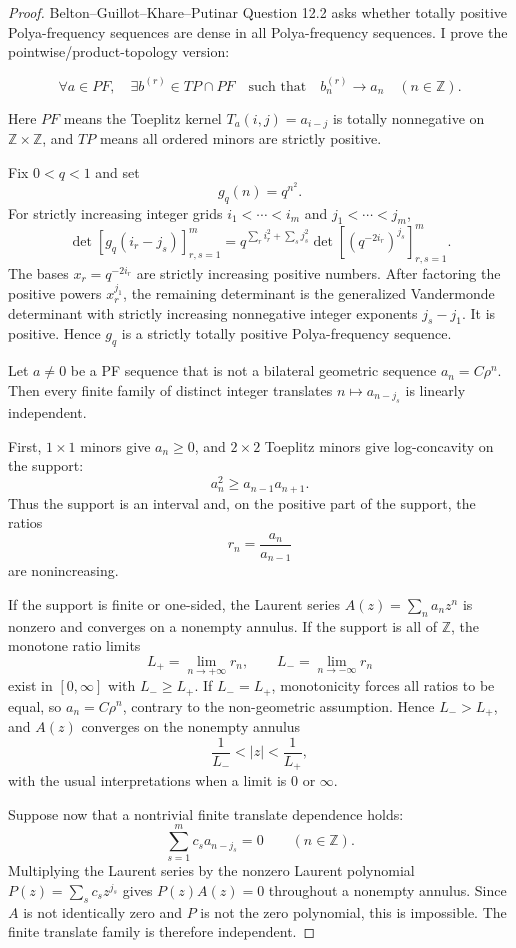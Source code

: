 \documentclass[11pt]{article}
\numberwithin{equation}{section}
\theoremstyle{definition}
\theoremstyle{remark}
\newcommand{\1}{\mathbf 1}
\begin{document}
\begin{proof}
Belton--Guillot--Khare--Putinar Question 12.2 asks whether totally positive Polya-frequency sequences are dense in all Polya-frequency sequences. I prove the pointwise/product-topology version:

\[
\forall a\in PF,\quad \exists b^{(r)}\in TP\cap PF
\quad\text{such that}\quad b^{(r)}_n\to a_n\quad(n\in\mathbb Z).
\]

Here \(PF\) means the Toeplitz kernel \(T_a(i,j)=a_{i-j}\) is totally nonnegative on \(\mathbb Z\times\mathbb Z\), and \(TP\) means all ordered minors are strictly positive.

Fix \(0<q<1\) and set
\[
g_q(n)=q^{n^2}.
\]
For strictly increasing integer grids \(i_1<\cdots<i_m\) and \(j_1<\cdots<j_m\),
\[
\det[g_q(i_r-j_s)]_{r,s=1}^m
=
q^{\sum_r i_r^2+\sum_s j_s^2}
\det[(q^{-2i_r})^{j_s}]_{r,s=1}^m .
\]
The bases \(x_r=q^{-2i_r}\) are strictly increasing positive numbers. After factoring the positive powers \(x_r^{j_1}\), the remaining determinant is the generalized Vandermonde determinant with strictly increasing nonnegative integer exponents \(j_s-j_1\). It is positive. Hence \(g_q\) is a strictly totally positive Polya-frequency sequence.

Let \(a\neq0\) be a PF sequence that is not a bilateral geometric sequence \(a_n=C\rho^n\). Then every finite family of distinct integer translates \(n\mapsto a_{n-j_s}\) is linearly independent.

First, \(1\times1\) minors give \(a_n\ge0\), and \(2\times2\) Toeplitz minors give log-concavity on the support:
\[
a_n^2\ge a_{n-1}a_{n+1}.
\]
Thus the support is an interval and, on the positive part of the support, the ratios
\[
r_n=\frac{a_n}{a_{n-1}}
\]
are nonincreasing.

If the support is finite or one-sided, the Laurent series \(A(z)=\sum_n a_nz^n\) is nonzero and converges on a nonempty annulus. If the support is all of \(\mathbb Z\), the monotone ratio limits
\[
L_+=\lim_{n\to+\infty}r_n,\qquad L_-=\lim_{n\to-\infty}r_n
\]
exist in \([0,\infty]\) with \(L_-\ge L_+\). If \(L_-=L_+\), monotonicity forces all ratios to be equal, so \(a_n=C\rho^n\), contrary to the non-geometric assumption. Hence \(L_->L_+\), and \(A(z)\) converges on the nonempty annulus
\[
\frac1{L_-}<|z|<\frac1{L_+},
\]
with the usual interpretations when a limit is \(0\) or \(\infty\).

Suppose now that a nontrivial finite translate dependence holds:
\[
\sum_{s=1}^m c_s a_{n-j_s}=0\qquad(n\in\mathbb Z).
\]
Multiplying the Laurent series by the nonzero Laurent polynomial \(P(z)=\sum_s c_s z^{j_s}\) gives \(P(z)A(z)=0\) throughout a nonempty annulus. Since \(A\) is not identically zero and \(P\) is not the zero polynomial, this is impossible. The finite translate family is therefore independent.


\end{proof}
\end{document}
